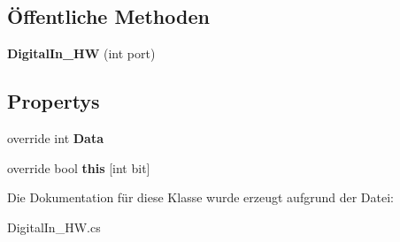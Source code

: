 \subsection*{Öffentliche Methoden}
\begin{DoxyCompactItemize}
\item 
\hypertarget{class_robot_ctrl_1_1_digital_in___h_w_a50234a4b44c4c522abe6565a3111309e}{
{\bfseries DigitalIn\_\-HW} (int port)}
\label{class_robot_ctrl_1_1_digital_in___h_w_a50234a4b44c4c522abe6565a3111309e}

\end{DoxyCompactItemize}
\subsection*{Propertys}
\begin{DoxyCompactItemize}
\item 
\hypertarget{class_robot_ctrl_1_1_digital_in___h_w_a22093ed6e3a1b15bbb0406fd56d9b0cc}{
override int {\bfseries Data}}
\label{class_robot_ctrl_1_1_digital_in___h_w_a22093ed6e3a1b15bbb0406fd56d9b0cc}

\item 
\hypertarget{class_robot_ctrl_1_1_digital_in___h_w_a1197c7dee03f1a9844a5824e3c6e0941}{
override bool {\bfseries this} \mbox{[}int bit\mbox{]}}
\label{class_robot_ctrl_1_1_digital_in___h_w_a1197c7dee03f1a9844a5824e3c6e0941}

\end{DoxyCompactItemize}


Die Dokumentation für diese Klasse wurde erzeugt aufgrund der Datei:\begin{DoxyCompactItemize}
\item 
DigitalIn\_\-HW.cs\end{DoxyCompactItemize}
